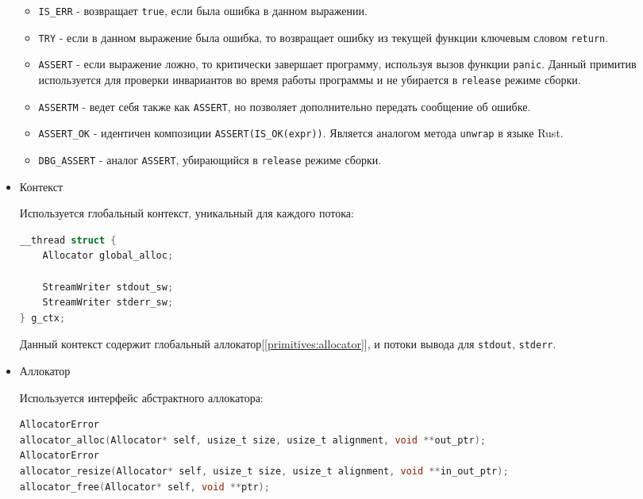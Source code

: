 \begin{itemize}
\begin{itemize}
    \item \verb|IS_ERR| - возвращает \verb|true|, если была ошибка в данном выражении.

    \item \verb|TRY| - если в данном выражение была ошибка, то возвращает ошибку из текущей функции ключевым словом \verb|return|.

    \item \verb|ASSERT| - если выражение ложно, то критически завершает программу, используя вызов функции \verb|panic|.
    Данный примитив используется для проверки инвариантов во время работы программы и не убирается в \verb|release| режиме сборки.

    \item \verb|ASSERTM| - ведет себя также как \verb|ASSERT|, но позволяет дополнительно передать сообщение об ошибке.

    \item \verb|ASSERT_OK| - идентичен композиции \verb|ASSERT(IS_OK(expr))|.
    Является аналогом метода \verb|unwrap| в языке Rust.

    \item \verb|DBG_ASSERT| - аналог \verb|ASSERT|, убирающийся в \verb|release| режиме сборки.
\end{itemize}

\item Контекст

Используется глобальный контекст, уникальный для каждого потока:

\begin{lstlisting}[language=c, caption={Структура глобального контекста}, label={primitives:g_ctx-struct}]
__thread struct {
    Allocator global_alloc;

    StreamWriter stdout_sw;
    StreamWriter stderr_sw;
} g_ctx;
\end{lstlisting} 

Данный контекст содержит глобальный аллокатор[\ref{primitives:allocator}], и потоки вывода для \verb|stdout|, \verb|stderr|.

\item\label{primitives:allocator} Аллокатор

Используется интерфейс абстрактного аллокатора:

\begin{lstlisting}[language=c, caption={Интерфейс абстрактного аллокатора}, label={primitives:allocator-api}]
AllocatorError
allocator_alloc(Allocator* self, usize_t size, usize_t alignment, void **out_ptr);
AllocatorError
allocator_resize(Allocator* self, usize_t size, usize_t alignment, void **in_out_ptr);
allocator_free(Allocator* self, void **ptr);


\end{lstlisting}
\end{itemize}
